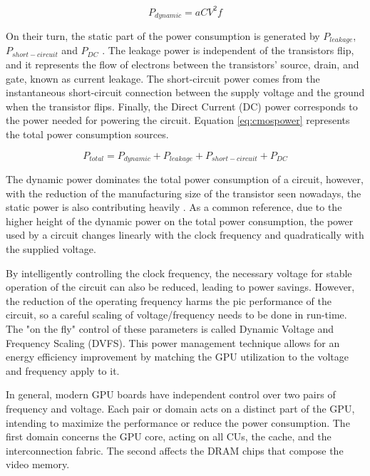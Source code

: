 \begin{equation}
    P_{dynamic} = aCV^2f
    \label{eq:dynpower}
\end{equation}


On their turn, the static part of the power consumption is generated by $P_{leakage}$, $P_{short-circuit}$ and $P_{DC}$ \cite{mei_survey_2016}. The leakage power is independent of the transistors flip, and it represents the flow of electrons between the transistors' source, drain, and gate, known as current leakage. The short-circuit power comes from the instantaneous short-circuit connection between the supply voltage and the ground when the transistor flips. Finally, the Direct Current (DC) power corresponds to the power needed for powering the circuit. Equation \ref{eq:cmospower} represents the total power consumption sources.

\begin{equation}
    P_{total} = P_{dynamic} + P_{leakage} + P_{short-circuit} + P_{DC}
    \label{eq:cmospower}
\end{equation}

The dynamic power dominates the total power consumption of a circuit, however, with the reduction of the manufacturing size of the transistor seen nowadays, the static power is also contributing heavily \cite{s._hong_modeling_2012} \cite{hong_integrated_2010}. As a common reference, due to the higher height of the dynamic power on the total power consumption, the power used by a circuit changes linearly with the clock frequency and quadratically with the supplied voltage.


By intelligently controlling the clock frequency, the necessary voltage for stable operation of the circuit can also be reduced, leading to power savings. However, the reduction of the operating frequency harms the pic performance of the circuit, so a careful scaling of voltage/frequency needs to be done in run-time. The "on the fly" control of these parameters is called Dynamic Voltage and Frequency Scaling (DVFS). This power management technique allows for an energy efficiency improvement by matching the GPU utilization to the voltage and frequency apply to it.

In general, modern GPU boards have independent control over two pairs of frequency and voltage. Each pair or domain acts on a distinct part of the GPU, intending to maximize the performance or reduce the power consumption. The first domain concerns the GPU core, acting on all CUs, the cache, and the interconnection fabric. The second affects the DRAM chips that compose the video memory. 

